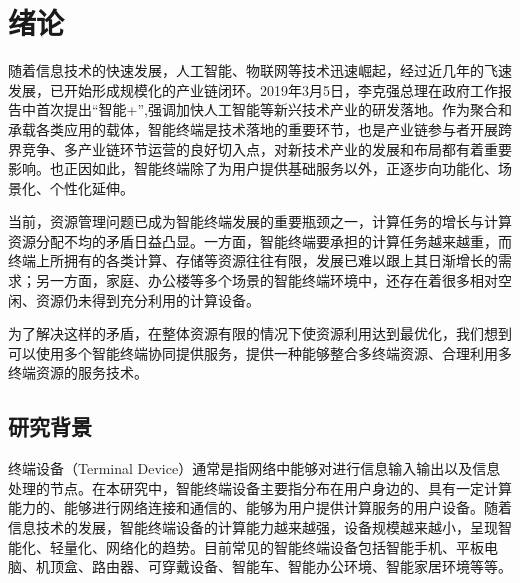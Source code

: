 \chapter{绪论}\label{chap:introduction}

随着信息技术的快速发展，人工智能、物联网等技术迅速崛起，经过近几年的飞速发展，已开始形成规模化的产业链闭环。2019年3月5日，李克强总理在政府工作报告中首次提出“智能+”,强调加快人工智能等新兴技术产业的研发落地。作为聚合和承载各类应用的载体，智能终端是技术落地的重要环节，也是产业链参与者开展跨界竞争、多产业链环节运营的良好切入点，对新技术产业的发展和布局都有着重要影响。也正因如此，智能终端除了为用户提供基础服务以外，正逐步向功能化、场景化、个性化延伸。

当前，资源管理问题已成为智能终端发展的重要瓶颈之一，计算任务的增长与计算资源分配不均的矛盾日益凸显。一方面，智能终端要承担的计算任务越来越重，而终端上所拥有的各类计算、存储等资源往往有限，发展已难以跟上其日渐增长的需求；另一方面，家庭、办公楼等多个场景的智能终端环境中，还存在着很多相对空闲、资源仍未得到充分利用的计算设备。

为了解决这样的矛盾，在整体资源有限的情况下使资源利用达到最优化，我们想到可以使用多个智能终端协同提供服务，提供一种能够整合多终端资源、合理利用多终端资源的服务技术。



\section{研究背景}

终端设备（Terminal Device）通常是指网络中能够对进行信息输入输出以及信息处理的节点\citep{2004支持普适计算的智能终端服务及设备管理技术研究}。在本研究中，智能终端设备主要指分布在用户身边的、具有一定计算能力的、能够进行网络连接和通信的、能够为用户提供计算服务的用户设备。随着信息技术的发展，智能终端设备的计算能力越来越强，设备规模越来越小，呈现智能化、轻量化、网络化的趋势。目前常见的智能终端设备包括智能手机、平板电脑、机顶盒、路由器、可穿戴设备、智能车、智能办公环境、智能家居环境等等。

